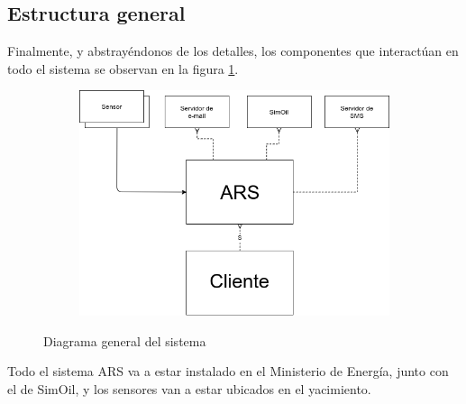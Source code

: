 \subsection{Estructura general}

Finalmente, y abstrayéndonos de los detalles, los componentes que interactúan en todo el sistema se observan en la figura \ref{fig:general}.

\begin{figure}[H]
  \begin{subfigure}{\textwidth}
    \includegraphics[width=\textwidth]{imagenes/diagramas/general.png}
  \end{subfigure}
  \caption{Diagrama general del sistema}
  \label{fig:general}
\end{figure}

Todo el sistema ARS va a estar instalado en el Ministerio de Energía, junto con el de SimOil, y los sensores van a estar ubicados en el yacimiento.


\newpage